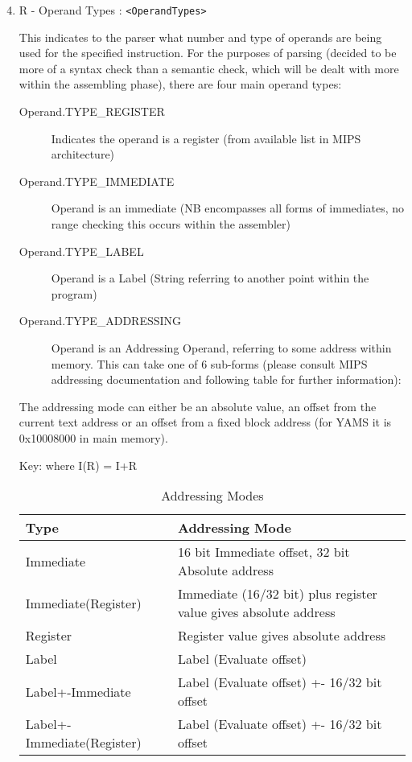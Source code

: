 \begin{enumerate}
\setcounter{enumi}{3}

\item R - Operand Types : \verb"<OperandTypes>"


This indicates to the parser what number and type of operands are being used for the specified instruction. For the purposes of parsing (decided to be more of a syntax check than a semantic check, which will be dealt with more within the assembling phase), there are four main operand types:

\begin{description}

\item[Operand.TYPE\_REGISTER]
Indicates the operand is a register (from available list in MIPS architecture)
\item[Operand.TYPE\_IMMEDIATE]
Operand is an immediate (NB encompasses all forms of immediates, no range checking this occurs within the assembler)
\item[Operand.TYPE\_LABEL]
Operand is a Label (String referring to another point within the program)
\item[Operand.TYPE\_ADDRESSING]
Operand is an Addressing Operand, referring to some address within memory. This can take one of 6 sub-forms (please consult MIPS addressing documentation and following table for further information):

\end{description}

The addressing mode can either be an absolute value, an offset from the current text address or an offset from a fixed block address (for YAMS it is 0x10008000 in main memory).

Key: where I(R) = I+R

\begin{table}[]
\begin{center}
	\begin{tabular}{|l|p{3in}|}
		\hline
		Type & Addressing Mode \\
		\hline
		Immediate & 16 bit Immediate offset, 32 bit Absolute address \\
		Immediate(Register) & Immediate (16/32 bit) plus register value gives absolute address \\
		Register & Register value gives absolute address \\
		Label & Label (Evaluate offset) \\
		Label+-Immediate & Label (Evaluate offset) +- 16/32 bit offset \\
		Label+-Immediate(Register) & Label (Evaluate offset) +- 16/32 bit offset \\
		\hline
	\end{tabular}
\caption{Addressing Modes}
\end{center}
\end{table}




\end{enumerate}
